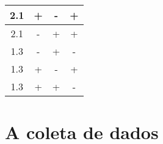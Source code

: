 \begin{table}[H]
{\begin{tabular}{c|c|c|c}
  2.1             & +              & -                    & +                       \\ \hline
  2.1             & -              & +                    & +                       \\ \hline
  1.3             & -              & +                    & -                       \\ \hline
  1.3             & +              & -                    & +                       \\ \hline
  1.3             & +              & +                    & -
  \end{tabular}%
  }
  \label{tab:experimento_modelagem_helicoptero_papel}
\end{table}

\section{A coleta de dados}
\label{sec:primeiro_experimento_a_coleta_de_dados}

